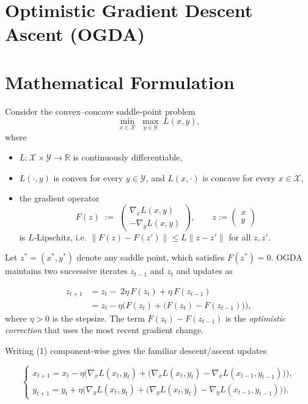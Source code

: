 \documentclass{article}
\begin{document}
\section*{Optimistic Gradient Descent Ascent (OGDA)}

\section*{Mathematical Formulation}
Consider the convex–concave saddle‑point problem  
\[
\min_{x\in\mathcal X}\;\max_{y\in\mathcal Y}\;L(x,y),
\]
where  

\begin{itemize}
    \item $L:\mathcal X\times\mathcal Y\rightarrow\mathbb R$ is continuously differentiable,
    \item $L(\cdot ,y)$ is convex for every $y\in\mathcal Y$, and $L(x,\cdot )$ is concave for every $x\in\mathcal X$,
    \item the gradient operator 
    \[
        F(z)\;:=\;\begin{pmatrix}
            \nabla_x L(x,y)\\[2mm]
            -\nabla_y L(x,y)
        \end{pmatrix},
        \qquad z:=\begin{pmatrix}x\\y\end{pmatrix}
    \]
    is $L$‑Lipschitz, i.e. $\|F(z)-F(z')\|\le L\|z-z'\|$ for all $z,z'$.
\end{itemize}

Let $z^*=(x^*,y^*)$ denote any saddle point, which satisfies $F(z^*)=0$.
OGDA maintains two successive iterates $z_{t-1}$ and $z_t$ and updates as  

\[
\boxed{
\begin{aligned}
z_{t+1}
&=z_t-\;2\eta\,F(z_t)+\eta\,F(z_{t-1}) \\[1mm]
&=z_t-\eta\Big(F(z_t)+\big(F(z_t)-F(z_{t-1})\big)\Big),
\end{aligned}}
\tag{1}
\]
where $\eta>0$ is the stepsize.  The term $F(z_t)-F(z_{t-1})$ is the \emph{optimistic correction} that uses the most recent gradient change.

Writing (1) component‑wise gives the familiar descent/ascent updates  

\[
\begin{cases}
x_{t+1}=x_t-\eta\big(\nabla_x L(x_t,y_t)+\big(\nabla_x L(x_t,y_t)-\nabla_x L(x_{t-1},y_{t-1})\big)\big),\\[2mm]
y_{t+1}=y_t+\eta\big(\nabla_y L(x_t,y_t)+\big(\nabla_y L(x_t,y_t)-\nabla_y L(x_{t-1},y_{t-1})\big)\big).
\end{cases}
\tag{2}
\]
\end{document}
